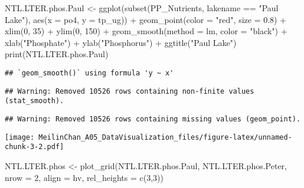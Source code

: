 \documentclass[
]{article}
\newenvironment{Shaded}{\begin{snugshade}}{\end{snugshade}}
\newcommand{\AttributeTok}[1]{\textcolor[rgb]{0.77,0.63,0.00}{#1}}
\newcommand{\DecValTok}[1]{\textcolor[rgb]{0.00,0.00,0.81}{#1}}
\newcommand{\FloatTok}[1]{\textcolor[rgb]{0.00,0.00,0.81}{#1}}
\newcommand{\FunctionTok}[1]{\textcolor[rgb]{0.00,0.00,0.00}{#1}}
\newcommand{\NormalTok}[1]{#1}
\newcommand{\OtherTok}[1]{\textcolor[rgb]{0.56,0.35,0.01}{#1}}
\newcommand{\SpecialCharTok}[1]{\textcolor[rgb]{0.00,0.00,0.00}{#1}}
\newcommand{\StringTok}[1]{\textcolor[rgb]{0.31,0.60,0.02}{#1}}
\begin{document}
\begin{Shaded}
\begin{Highlighting}[]
\NormalTok{NTL.LTER.phos.Paul }\OtherTok{\textless{}{-}} \FunctionTok{ggplot}\NormalTok{(}\FunctionTok{subset}\NormalTok{(PP\_Nutrients, lakename }\SpecialCharTok{==} \StringTok{"Paul Lake"}\NormalTok{), }
                             \FunctionTok{aes}\NormalTok{(}\AttributeTok{x =}\NormalTok{ po4, }\AttributeTok{y =}\NormalTok{ tp\_ug)) }\SpecialCharTok{+}
  \FunctionTok{geom\_point}\NormalTok{(}\AttributeTok{color =} \StringTok{"red"}\NormalTok{, }\AttributeTok{size =} \FloatTok{0.8}\NormalTok{) }\SpecialCharTok{+}
  \FunctionTok{xlim}\NormalTok{(}\DecValTok{0}\NormalTok{, }\DecValTok{35}\NormalTok{) }\SpecialCharTok{+}
  \FunctionTok{ylim}\NormalTok{(}\DecValTok{0}\NormalTok{, }\DecValTok{150}\NormalTok{) }\SpecialCharTok{+}
  \FunctionTok{geom\_smooth}\NormalTok{(}\AttributeTok{method =}\NormalTok{ lm, }\AttributeTok{color =} \StringTok{"black"}\NormalTok{) }\SpecialCharTok{+}
  \FunctionTok{xlab}\NormalTok{(}\StringTok{"Phosphate"}\NormalTok{) }\SpecialCharTok{+}
  \FunctionTok{ylab}\NormalTok{(}\StringTok{"Phosphorus"}\NormalTok{) }\SpecialCharTok{+}
  \FunctionTok{ggtitle}\NormalTok{(}\StringTok{"Paul Lake"}\NormalTok{)}
\FunctionTok{print}\NormalTok{(NTL.LTER.phos.Paul)}
\end{Highlighting}
\end{Shaded}

\begin{verbatim}
## `geom_smooth()` using formula 'y ~ x'
\end{verbatim}

\begin{verbatim}
## Warning: Removed 10526 rows containing non-finite values (stat_smooth).
\end{verbatim}

\begin{verbatim}
## Warning: Removed 10526 rows containing missing values (geom_point).
\end{verbatim}

\texttt{[image: MeilinChan\_A05\_DataVisualization\_files/figure-latex/unnamed-chunk-3-2.pdf]}

\begin{Shaded}
\begin{Highlighting}[]
\NormalTok{NTL.LTER.phos }\OtherTok{\textless{}{-}} \FunctionTok{plot\_grid}\NormalTok{(NTL.LTER.phos.Paul, NTL.LTER.phos.Peter, }
                           \AttributeTok{nrow =} \DecValTok{2}\NormalTok{, }\AttributeTok{align =} \StringTok{\textquotesingle{}hv\textquotesingle{}}\NormalTok{, }\AttributeTok{rel\_heights =} \FunctionTok{c}\NormalTok{(}\DecValTok{3}\NormalTok{,}\DecValTok{3}\NormalTok{))}
\end{Highlighting}
\end{Shaded}
\end{document}
